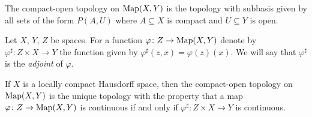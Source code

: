 \begin{definition}
The compact-open topology on $\mathrm{Map}(X, Y)$ is the topology with subbasis given by 
all sets of the form $P(A, U)$ where $A\subseteq X$ is compact and $U\subseteq Y$
is open. 
\end{definition}


Let $X$, $Y$, $Z$ be spaces. For a function $\varphi \colon Z \to \mathrm{Map}(X, Y)$
denote by $\varphi^{\sharp}\colon Z\times X \to Y$ the function given by 
$\varphi^{\sharp}(z, x) = \varphi(z)(x)$. We will say that $\varphi^{\sharp}$
is the \emph{adjoint} of $\varphi$.

\begin{theorem}
If $X$ is a locally compact Hausdorff space, then the compact-open topology on $\mathrm{Map}(X, Y)$
is the unique topology with the property that a map $\varphi\colon Z \to \mathrm{Map}(X, Y)$
is continuous if and only if $\varphi^{\sharp}\colon Z\times X \to Y$ is continuous.
\end{theorem}

